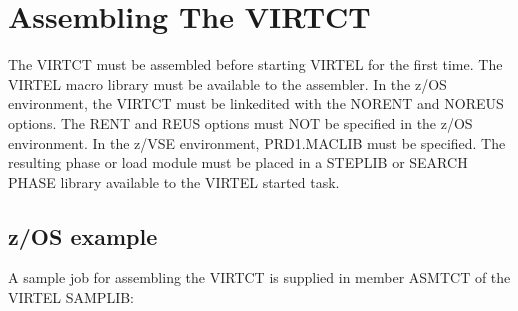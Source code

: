 \documentclass[letterpaper,10pt,english]{sphinxmanual}
\begin{document}
\begin{sphinxVerbatim}[commandchars=\\\{\}]
   
   
\end{sphinxVerbatim}

\sphinxAtStartPar
{}

\ignorespaces 

\section{Assembling The VIRTCT}
\label{\detokenize{Installation_Guide:index-148}}\label{\detokenize{Installation_Guide:id8}}
\sphinxAtStartPar
The VIRTCT must be assembled before starting VIRTEL for the first time. The VIRTEL macro library must be available to the assembler. In the z/OS environment, the VIRTCT must be link\sphinxhyphen{}edited with the NORENT and NOREUS options. The RENT and REUS options must NOT be specified in the z/OS environment. In the z/VSE environment, PRD1.MACLIB must be specified. The resulting phase or load module must be placed in a STEPLIB or SEARCH PHASE library available to the VIRTEL started task.

\ignorespaces 

\subsection{z/OS example}
\label{\detokenize{Installation_Guide:z-os-example}}\label{\detokenize{Installation_Guide:index-149}}
\sphinxAtStartPar
A sample job for assembling the VIRTCT is supplied in member ASMTCT of the VIRTEL SAMPLIB:
\end{document}
